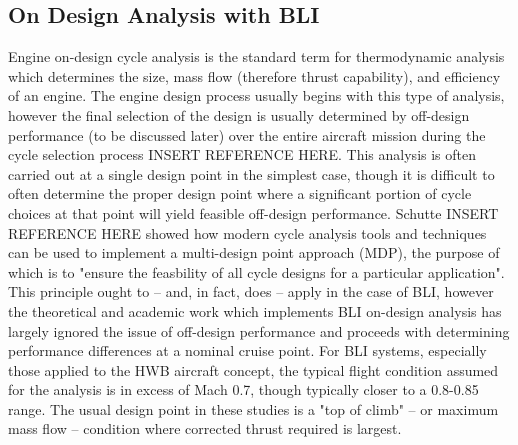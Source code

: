 \documentclass[12pt]{gatech-thesis}
\begin{document}
\subsection{On Design Analysis with BLI}

Engine on-design cycle analysis is the standard term for thermodynamic analysis which determines the size, mass flow (therefore thrust capability), and efficiency of an engine.  The engine design process usually begins with this type of analysis, however the final selection of the design is usually determined by off-design performance (to be discussed later) over the entire aircraft mission during the cycle selection process INSERT REFERENCE HERE.  This analysis is often carried out at a single design point in the simplest case, though it is difficult to often determine the proper design point where a significant portion of cycle choices at that point will yield feasible off-design performance.  Schutte INSERT REFERENCE HERE showed how modern cycle analysis tools and techniques can be used to implement a multi-design point approach (MDP), the purpose of which is to "ensure the feasbility of all cycle designs for a particular application".  This principle ought to -- and, in fact, does -- apply in the case of BLI, however the theoretical and academic work which implements BLI on-design analysis has largely ignored the issue of off-design performance and proceeds with determining performance differences at a nominal cruise point.  For BLI systems, especially those applied to the HWB aircraft concept, the typical flight condition assumed for the analysis is in excess of Mach 0.7, though typically closer to a 0.8-0.85 range.  The usual design point in these studies is a "top of climb" -- or maximum mass flow -- condition where corrected thrust required is largest.
\end{document}
